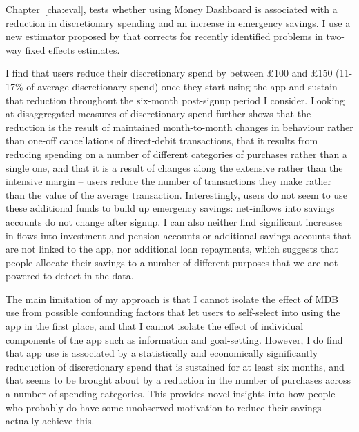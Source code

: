 Chapter~\ref{cha:eval}, tests whether using Money Dashboard is associated with
a reduction in discretionary spending and an increase in emergency savings. I
use a new estimator proposed by \citet{callaway2021difference} that corrects
for recently identified problems in two-way fixed effects estimates.

I find that users reduce their discretionary spend by between \pounds100 and
\pounds150 (11-17\% of average discretionary spend) once they start using the
app and sustain that reduction throughout the six-month post-signup period I
consider. Looking at disaggregated measures of discretionary spend further
shows that the reduction is the result of maintained month-to-month changes in
behaviour rather than one-off cancellations of direct-debit transactions, that
it results from reducing spending on a number of different categories of
purchases rather than a single one, and that it is a result of changes along
the extensive rather than the intensive margin -- users reduce the number of
transactions they make rather than the value of the average transaction.
Interestingly, users do not seem to use these additional funds to build up
emergency savings: net-inflows into savings accounts do not change after
signup. I can also neither find significant increases in flows into investment
and pension accounts or additional savings accounts that are not linked to the
app, nor additional loan repayments, which suggests that people allocate their
savings to a number of different purposes that we are not powered to detect in
the data.

The main limitation of my approach is that I cannot isolate the effect of MDB
use from possible confounding factors that let users to self-select into using
the app in the first place, and that I cannot isolate the effect of individual
components of the app such as information and goal-setting. However, I do find
that app use is associated by a statistically and economically significantly
reducuction of discretionary spend that is sustained for at least six months,
and that seems to be brought about by a reduction in the number of purchases
across a number of spending categories. This provides novel insights into how
people who probably do have some unobserved motivation to reduce their savings
actually achieve this. 


